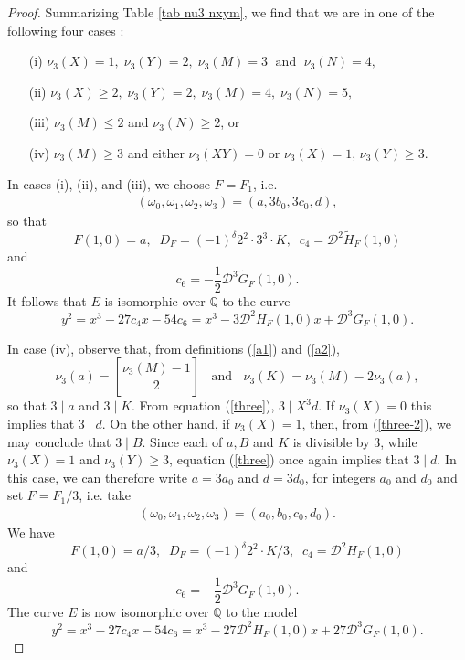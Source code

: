 \documentclass[11pt]{report}
\theoremstyle{definition}
\begin{document}
\begin{proof}
Summarizing Table \ref{tab nu3 nxym},  we find that we are in one of the following four cases :

\begin{enumerate}
\item[(i)] $\nu_3 (X)=1, \;  \nu_3(Y) =2,  \; \nu_3(M)=3 \; \mbox{ and } \;  \nu_3(N)=4,$
\item[(ii)] $\nu_3(X) \geq 2, \;  \nu_3(Y) =2, \; \nu_3(M) =4, \; \nu_3(N)=5,$
\item[(iii)] $\nu_3(M) \leq 2 $ and $ \nu_3(N) \geq 2$, or
\item[(iv)] $\nu_3 (M)  \geq 3$ and either $\nu_3 (XY)=0 $ or $\nu_3(X)=1, \,  \nu_3(Y) \geq 3$.
\end{enumerate}
In cases (i), (ii), and (iii), we choose $F=F_1$, i.e.
\begin{align*}
(\omega_0,\omega_1,\omega_2,\omega_3) = (a, 3 b_0, 3 c_0, d),
\end{align*}
so that
\[F(1,0)=a, \; \; D_{F} = (-1)^\delta 2^2 \cdot 3^3 \cdot K, \; \;
c_4 = \mathcal{D}^2 \widetilde{H}_{F} (1,0)\]
and
\[c_6 = - \frac{1}{2}  \mathcal{D}^3 \widetilde{G}_{F} (1,0).\]
It follows that $E$ is isomorphic over $\mathbb{Q}$ to the curve
$$
y^2 = x^3 -27 c_4 x -54 c_6 = x^3 - 3 \mathcal{D}^2 H_{F}(1,0) x + \mathcal{D}^3 G_{F}(1,0).
$$

In  case (iv), observe that, from definitions (\ref{a1}) and (\ref{a2}),
\begin{equation} \label{foster}
\nu_3(a) = \left[ \frac{\nu_3(M)-1}{2} \right] \; \; \mbox{ and } \; \;
\nu_3(K) = \nu_3(M) - 2 \nu_3 (a),
\end{equation}
so that $3 \mid a$ and $3 \mid K$. From equation (\ref{three}),  $3 \mid X^3 d$.
If $\nu_3(X)=0$ this implies that $3 \mid d$. On the other hand,
if $\nu_3(X)=1$, then, from (\ref{three-2}), we may conclude that $3 \mid B$. Since each of $a, B$ and $K$ is divisible by $3$, while $\nu_3 (X) =1$ and $\nu_3 (Y) \geq 3$,  equation (\ref{three})
once again implies that $3 \mid d$.
In this case, we can therefore write $a = 3a_0$ and $d=3d_0$, for integers $a_0$ and $d_0$ and
set $F = F_1/3$, i.e. take
\begin{align*}
(\omega_0,\omega_1,\omega_2,\omega_3) = (a_0, b_0, c_0, d_0).
\end{align*}
We have
\[F(1,0) =a/3, \; \;  D_{F}  = (-1)^\delta 2^2  \cdot K/3, \; \;
c_4 = \mathcal{D}^2 H_{F} (1,0)\]
and
\[c_6 = - \frac{1}{2}  \mathcal{D}^3 G_{F} (1,0).\]
The curve $E$ is now isomorphic over $\mathbb{Q}$ to the model
$$
y^2 = x^3 -27 c_4 x -54 c_6 = x^3 - 27 \mathcal{D}^2 H_{F}(1,0) x + 27 \mathcal{D}^3 G_{F}(1,0).
$$


\end{proof}
\end{document}
